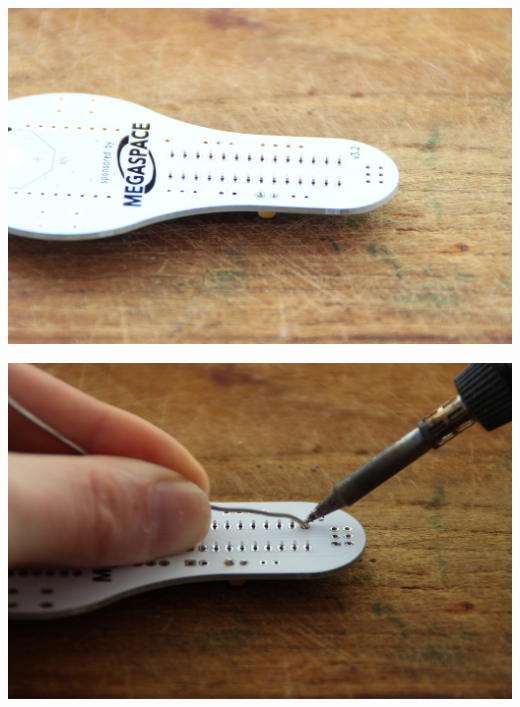 \documentclass{article}
\begin{document}
\vspace{0.5cm}

\begin{minipage}[b]{0.5\textwidth}
	\includegraphics[width=\textwidth]{Bilder2023/IMG_8346.JPG}
\end{minipage}
\begin{minipage}[b]{0.5\textwidth}
	\includegraphics[width=\textwidth]{Bilder2023/IMG_8353.JPG}
\end{minipage}

\vspace{0.5cm}
\end{document}
